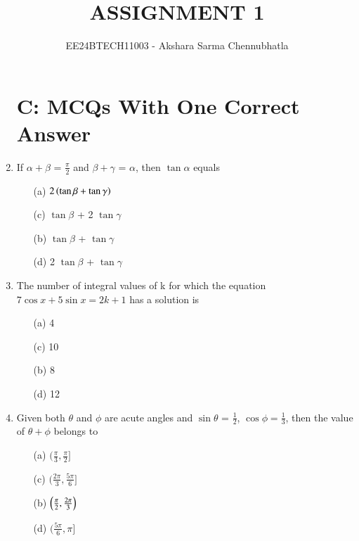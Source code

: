 \documentclass[journal,12pt,twocolumn,article]{IEEEtran}
\theoremstyle{remark}
\begin{document}
\begin{enumerate}[start = 20]

\vspace{3cm}
\title{ASSIGNMENT 1}
\author{EE24BTECH11003 - Akshara Sarma Chennubhatla}
\maketitle
\newpage
\bigskip
\section*{C: MCQs With One Correct Answer}
\item If $\alpha + \beta$ = $\frac{\pi}{2}$ and $\beta + \gamma$ = $\alpha$, then $\tan \alpha$ equals
\hfill{}
\begin{multicols}{2}
\begin{enumerate}
\item[(a)] $2\left(\tan \beta + \tan \gamma\right)$
\item[(c)] $\tan\beta$ + 2 $\tan\gamma$
\columnbreak
\item[(b)] $\tan\beta$ + $\tan\gamma$
\item[(d)] 2 $\tan\beta$ + $\tan\gamma$
\end{enumerate}
\end{multicols}
\item The number of integral values of k for which the equation $7\cos x + 5\sin x = 2k+1$ has a solution is
\hfill{}
\begin{multicols}{2}
\begin{enumerate}
\item[(a)] 4
\item[(c)] 10
\columnbreak
\item[(b)] 8
\item[(d)] 12 
\end{enumerate}
\end{multicols}
\item Given both $\theta$ and $\phi$ are acute angles and $\sin\theta$ = $\frac{1}{2}$, $\cos\phi = \frac{1}{3}$, then the value of $\theta + \phi$ belongs to
\hfill{}
\begin{multicols}{2}
\begin{enumerate}
\item[(a)] $(\frac{\pi}{3},\frac{\pi}{2}]$
\item[(c)] $(\frac{2\pi}{3},\frac{5\pi}{6}]$
\columnbreak
\item[(b)] $\left(\frac{\pi}{2},\frac{2\pi}{3}\right)$
\item[(d)] $(\frac{5\pi}{6},\pi]$

\end{enumerate}
\end{multicols}
\end{enumerate}
\end{document}

